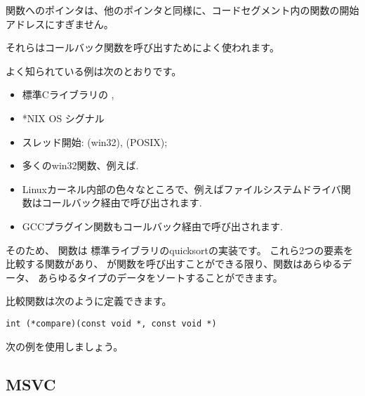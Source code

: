 ﻿\newcommand{\comp}{\TT{comp()}\xspace}
\label{sec:pointerstofunctions}

\myindex{\CLanguageElements!\Pointers}

関数へのポインタは、他のポインタと同様に、コードセグメント内の関数の開始アドレスにすぎません。

それらはコールバック関数を呼び出すためによく使われます。

よく知られている例は次のとおりです。

\begin{itemize}
\item 標準Cライブラリの \qsort,

\item *NIX OS シグナル

\item スレッド開始:  (win32),  (POSIX);

\item 多くのwin32関数、例えば.

\item Linuxカーネル内部の色々なところで、例えばファイルシステムドライバ関数はコールバック経由で呼び出されます.

\item GCCプラグイン関数もコールバック経由で呼び出されます.

\end{itemize}

\label{qsort}

そのため、 \qsort 関数は \CCpp 標準ライブラリのquicksortの実装です。 
これら2つの要素を比較する関数があり、 \qsort が関数を呼び出すことができる限り、関数はあらゆるデータ、
あらゆるタイプのデータをソートすることができます。

比較関数は次のように定義できます。

\begin{lstlisting}
int (*compare)(const void *, const void *)
\end{lstlisting}

次の例を使用しましょう。



\subsection{MSVC}

